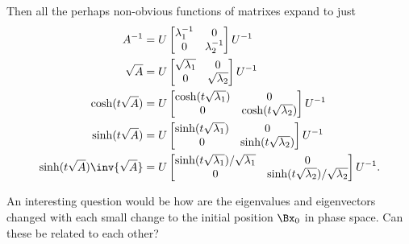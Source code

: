 Then all the perhaps non-obvious functions of matrixes expand to just
\begin{subequations}
\label{eqn:hoopSpring:13}
\begin{align}
A^{-1} &= U 
\begin{bmatrix}
\lambda_1^{-1} & 0 \\
0 & \lambda_2^{-1} 
\end{bmatrix}
U^{-1} \\
\sqrt{A} &= U 
\begin{bmatrix}
\sqrt{\lambda_1} & 0 \\
0 & \sqrt{\lambda_2}
\end{bmatrix}
U^{-1} \\
\cosh(t \sqrt{A}) &= U 
\begin{bmatrix}
\cosh( t \sqrt{\lambda_1} ) & 0 \\
0 & \cosh( t \sqrt{\lambda_2} )
\end{bmatrix}
U^{-1} \\
\sinh(t \sqrt{A}) &= U 
\begin{bmatrix}
\sinh( t \sqrt{\lambda_1} ) & 0 \\
0 & \sinh( t \sqrt{\lambda_2} )
\end{bmatrix}
U^{-1} \\
\sinh(t \sqrt{A}) \inv{\sqrt{A}} &= U 
\begin{bmatrix}
\sinh( t \sqrt{\lambda_1} )/\sqrt{\lambda_1} & 0 \\
0 & \sinh( t \sqrt{\lambda_2} )/\sqrt{\lambda_2}
\end{bmatrix}
U^{-1}.
\end{align}
\end{subequations}

An interesting question would be how are the eigenvalues and eigenvectors changed with each small change to the initial position $\Bx_0$ in phase space.  Can these be related to each other?

\EndNoBibArticle
